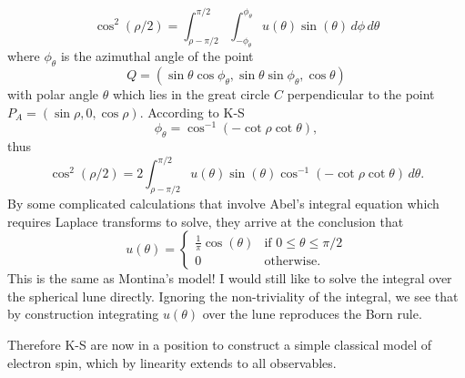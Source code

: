 \documentclass[12pt,draft]{article}
\theoremstyle{definition}
\theoremstyle{plain}
\begin{document}
    \begin{equation}
        \cos^2(\rho / 2)
        = \int_{\rho - \pi / 2}^{\pi / 2}
        \int_{-\phi_\theta}^{\phi_\theta}
        u(\theta) \sin(\theta) \, d\phi \, d\theta
    \end{equation}
    where $\phi_\theta$ is the azimuthal angle of the point
    \begin{equation}
        Q = (\sin\theta \cos\phi_\theta,\sin\theta
        \sin\phi_\theta, \cos\theta)
    \end{equation}
    with polar angle $\theta$ which lies in the great circle
    $C$ perpendicular to the point $P_A = (\sin\rho, 0,
    \cos\rho)$. According to K-S
    \begin{equation}
        \phi_\theta
        = \cos^{-1}(-\cot\rho \cot\theta),
    \end{equation}
    thus
    \begin{equation}
        \cos^2(\rho / 2)
        = 2 \int_{\rho - \pi / 2}^{\pi / 2} 
        u(\theta)\sin(\theta) \cos^{-1}(-\cot\rho
        \cot\theta) \, d\theta.
    \end{equation}
    By some complicated calculations that involve Abel's
    integral equation which requires Laplace transforms to
    solve, they arrive at the conclusion that
    \begin{equation}
        u(\theta)
        = \begin{cases}
            \frac{1}{\pi} \cos(\theta) & \text{if } 0 \leq
            \theta \leq \pi / 2 \\
            0 & \text{otherwise.}
        \end{cases}
    \end{equation}
    {\color{blue} This is the same as Montina's model! I
    would still like to solve the integral over the
    spherical lune directly.} Ignoring the non-triviality of
    the integral, we see that by construction integrating
    $u(\theta)$ over the lune reproduces the Born rule.
     
    Therefore K-S are now in a position to construct a
    simple classical model of electron spin, which by
    linearity extends to all observables. 
\end{document}
